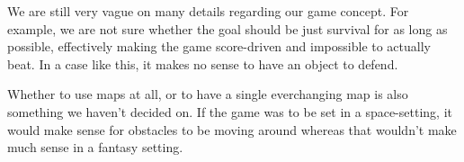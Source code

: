 We are still very vague on many details regarding our game concept. For example,
we are not sure whether the goal should be just survival for as long as possible,
effectively making the game score-driven and impossible to actually beat. In a
case like this, it makes no sense to have an object to defend.

Whether to use maps at all, or to have a single everchanging map is also something
we haven't decided on. If the game was to be set in a space-setting, it would
make sense for obstacles to be moving around whereas that wouldn't make much sense
in a fantasy setting.